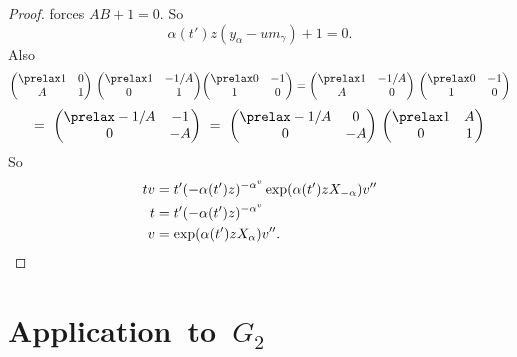 \documentclass{memo-l}
\theoremstyle{definition}
\theoremstyle{remark}
\numberwithin{section}{chapter}
\numberwithin{equation}{chapter}
\begin{document}
\begin{proof}
\noindent
forces  $AB + 1 = 0$.  So
$$
{\alpha}(t')z(y_{{\alpha}}-um_{{\gamma}})+1 = 0 .
$$
Also
$$
{\begin{pmatrix} \prelax  1 & 0 \\ A & 1 \end{pmatrix}}\ {\begin{pmatrix} \prelax  1 & -1/A \\ 0 & 1 \end{pmatrix}}
{\begin{pmatrix} \prelax  0 & -1 \\ 1 & 0 \end{pmatrix}} = {\begin{pmatrix} \prelax  1 & -1/A \\ A & 0 \end{pmatrix}}\
{\begin{pmatrix} \prelax  0 & -1 \\ 1 & 0 \end{pmatrix}}
$$
$$
=\ {\begin{pmatrix} \prelax  -1/A & -1 \\ 0 & -A \end{pmatrix}}\ =\
{\begin{pmatrix} \prelax  -1/A & 0 \\ 0 & -A \end{pmatrix}}\ {\begin{pmatrix} \prelax  1 & A \\ 0 & 1 \end{pmatrix}}
$$
So
$$
\aligned
tv &= t'(-{\alpha}(t')z)^{-\alpha^v} \exp({\alpha}(t')zX_{-{\alpha}})v'' \\
t &= t'(-{\alpha}(t')z)^{-\alpha^v} \\
v &= \exp({\alpha}(t')zX_{{\alpha}})v'' .
\endaligned
$$
\end{proof}








\section{Application\ to\ $G_2$}
\end{document}
